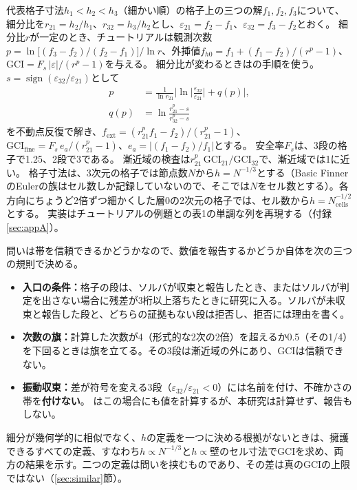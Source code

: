 \documentclass[twocolumn]{labreport}
\newcommand{\fine}{\mathrm{fine}}
\begin{document}
代表格子寸法$h_1<h_2<h_3$（細かい順）の格子上の三つの解$f_1,f_2,f_3$について、細分比を$r_{21}=h_2/h_1$、$r_{32}=h_3/h_2$とし、$\varepsilon_{21}=f_2-f_1$、$\varepsilon_{32}=f_3-f_2$とおく。
細分比$r$が一定のとき、チュートリアルは観測次数$p=\ln\!\big[(f_3-f_2)/(f_2-f_1)\big]/\ln r$、外挿値$f_{h0}=f_1+(f_1-f_2)/(r^p-1)$、$\mathrm{GCI}=F_s\,|\varepsilon|/(r^p-1)$を与える。
細分比が変わるときは\citet{celik2008}の手順を使う。$s=\operatorname{sign}(\varepsilon_{32}/\varepsilon_{21})$として
\begin{equation}
\label{eq:celik}
\begin{aligned}
p&=\frac{1}{\ln r_{21}}\Big|\ln\Big|\frac{\varepsilon_{32}}{\varepsilon_{21}}\Big|+q(p)\Big|,\\
q(p)&=\ln\frac{r_{21}^{p}-s}{r_{32}^{p}-s}
\end{aligned}
\end{equation}
を不動点反復で解き、$f_\mathrm{ext}=(r_{21}^{p}f_1-f_2)/(r_{21}^{p}-1)$、$\mathrm{GCI}_\fine=F_s\,e_a/(r_{21}^{p}-1)$、$e_a=|(f_1-f_2)/f_1|$とする。
安全率$F_s$は、3段の格子で1.25、2段で3である。
漸近域の検査は$r_{21}^{p}\,\mathrm{GCI}_{21}/\mathrm{GCI}_{32}$で、漸近域では1に近い。
格子寸法は、3次元の格子では節点数$N$から$h=N^{-1/3}$とする（Basic FinnerのEulerの族はセル数しか記録していないので、そこでは$N$をセル数とする）。各方向にちょうど2倍ずつ細かくした層0の2次元の格子では、セル数から$h=N_\mathrm{cells}^{-1/2}$とする。
実装はチュートリアルの例題と\citet{celik2008}の表1の単調な列を再現する（付録\ref{sec:appA}）。

問いは帯を信頼できるかどうかなので、数値を報告するかどうか自体を次の三つの規則で決める。
\begin{itemize}
\item \textbf{入口の条件：}格子の段は、ソルバが収束と報告したとき、またはソルバが判定を出さない場合に残差が3桁以上落ちたときに研究に入る。ソルバが未収束と報告した段と、どちらの証拠もない段は拒否し、拒否には理由を書く。
\item \textbf{次数の旗：}計算した次数が4（形式的な2次の2倍）を超えるか0.5（その1/4）を下回るときは旗を立てる。その3段は漸近域の外にあり、GCIは信頼できない。
\item \textbf{振動収束：}差が符号を変える3段（$\varepsilon_{32}/\varepsilon_{21}<0$）には名前を付け、不確かさの帯を\textbf{付けない}。
  \citet{celik2008}はこの場合にも値を計算するが、本研究は計算せず、報告もしない。
\end{itemize}
細分が幾何学的に相似でなく、$h$の定義を一つに決める根拠がないときは、擁護できるすべての定義、すなわち$h\propto N^{-1/3}$と$h\propto$壁のセル寸法でGCIを求め、両方の結果を示す。二つの定義は問いを挟むものであり、その差は真のGCIの上限ではない（\ref{sec:similar}節）。
\end{document}

